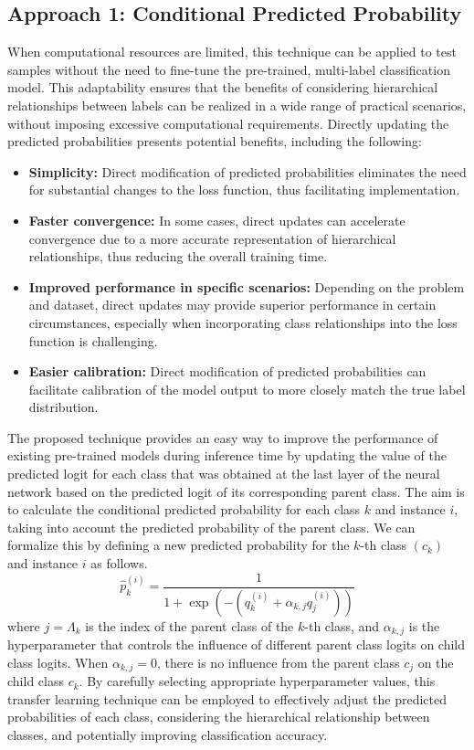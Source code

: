 \documentclass[authoryear,preprint,review,12pt]{elsarticle}
\begin{document}
\subsection{Approach 1: Conditional Predicted Probability}\label{subsec:taxonomy.method.approach1}
When computational resources are limited, this technique can be applied to test samples without the need to fine-tune the pre-trained, multi-label classification model. This adaptability ensures that the benefits of considering hierarchical relationships between labels can be realized in a wide range of practical scenarios, without imposing excessive computational requirements.
Directly updating the predicted probabilities presents potential benefits, including the following:
\begin{itemize}
    \item  \textbf{Simplicity:} Direct modification of predicted probabilities eliminates the need for substantial changes to the loss function, thus facilitating implementation.
    \item  \textbf{Faster convergence:} In some cases, direct updates can accelerate convergence due to a more accurate representation of hierarchical relationships, thus reducing the overall training time.
    \item  \textbf{Improved performance in specific scenarios:} Depending on the problem and dataset, direct updates may provide superior performance in certain circumstances, especially when incorporating class relationships into the loss function is challenging.
    \item  \textbf{Easier calibration:} Direct modification of predicted probabilities can facilitate calibration of the model output to more closely match the true label distribution.
\end{itemize}
The proposed technique provides an easy way to improve the performance of existing pre-trained models during inference time by updating the value of the predicted logit for each class that was obtained at the last layer of the neural network based on the predicted logit of its corresponding parent class. The aim is to calculate the conditional predicted probability for each class $k $ and instance $i $, taking into account the predicted probability of the parent class. We can formalize this by defining a new predicted probability for the $k$-th class $(c_k) $ and instance $i $ as follows.
\begin{equation}
    \widehat{p}_k^{(i)} = \frac{1}{ 1 + \exp \left(-\left(q_k^{(i)} + \alpha_{k,j} q_j^{(i)} \right)\right) }
    \label{eq:taxonomy.eq.1.pred.approach1}
\end{equation}
where $j=\Lambda_k$ is the index of the parent class of the $k$-th class, and $\alpha_{k,j} $ is the hyperparameter that controls the influence of different parent class logits on child class logits.
When $\alpha_{k,j}=0 $, there is no influence from the parent class $c_j$ on the child class $c_k$.  By carefully selecting appropriate hyperparameter values, this transfer learning technique can be employed to effectively adjust the predicted probabilities of each class, considering the hierarchical relationship between classes, and potentially improving classification accuracy.
\end{document}
